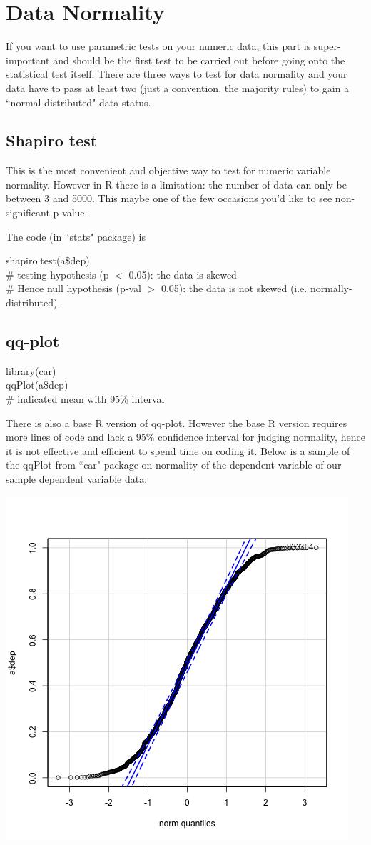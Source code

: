 \documentclass[../note.tex]{subfiles} %
\begin{document}
\section{Data Normality}
If you want to use parametric tests on your numeric data, this part is super-important and should be the first test to be carried out before going onto the statistical test itself.  There are three ways to test for data normality and your data have to pass at least two (just a convention, the majority rules) to gain a ``normal-distributed" data status.

\subsection{Shapiro test}
This is the most convenient and objective way to test for numeric variable normality.  However in R there is a limitation: the number of data can only be between 3 and 5000.  This maybe one of the few occasions you'd like to see non-significant p-value.

The code (in ``stats" package\autocite{Rcore}) is
\begin{code}
shapiro.test(a\$dep)\\
\# testing hypothesis (p $<$ 0.05): the data is skewed\\
\# Hence null hypothesis (p-val $>$ 0.05): the data is not skewed (i.e. normally-distributed).
\end{code}

\subsection{qq-plot}
\begin{code}
library(car)\\
qqPlot(a\$dep)\\
\# indicated mean with 95\% interval
\end{code}
There is also a base R version of qq-plot.  However the base R version requires more lines of code and lack a 95\% confidence interval for judging normality, hence it is not effective and efficient to spend time on coding it.  Below is a sample of the qqPlot from ``car" package on normality of the dependent variable of our sample dependent variable data:
\begin{center}
    \includegraphics[width=.5\linewidth]{../graph/qqPlot.png}
\end{center}
\end{document}

